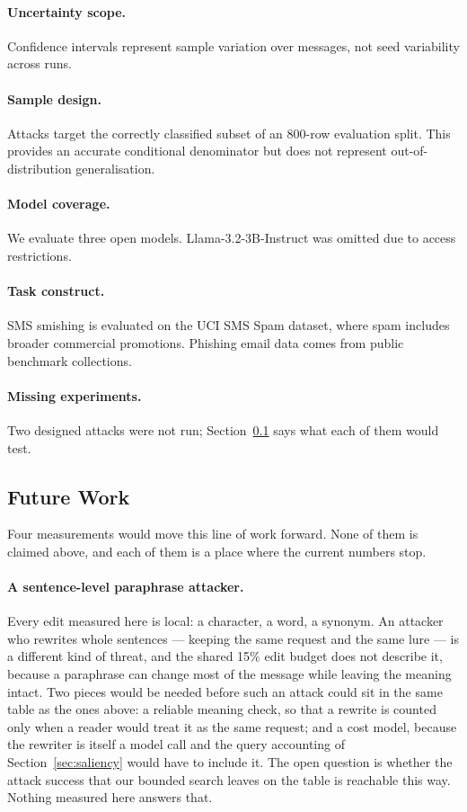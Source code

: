 \paragraph{Uncertainty scope.} Confidence intervals represent sample variation
over messages, not seed variability across runs.

\paragraph{Sample design.} Attacks target the correctly classified subset of an
800-row evaluation split. This provides an accurate conditional denominator but
does not represent out-of-distribution generalisation.

\paragraph{Model coverage.} We evaluate three open models. Llama-3.2-3B-Instruct
was omitted due to access restrictions.

\paragraph{Task construct.} SMS smishing is evaluated on the UCI SMS Spam
dataset, where spam includes broader commercial promotions. Phishing email data
comes from public benchmark collections.

\paragraph{Missing experiments.} Two designed attacks were not run;
Section~\ref{sec:futurework} says what each of them would test.

\subsection{Future Work}
\label{sec:futurework}

Four measurements would move this line of work forward. None of them is claimed
above, and each of them is a place where the current numbers stop.

\paragraph{A sentence-level paraphrase attacker.} Every edit measured here is
local: a character, a word, a synonym. An attacker who rewrites whole sentences
--- keeping the same request and the same lure --- is a different kind of threat,
and the shared 15\% edit budget does not describe it, because a paraphrase can
change most of the message while leaving the meaning intact. Two pieces would be
needed before such an attack could sit in the same table as the ones above: a
reliable meaning check, so that a rewrite is counted only when a reader would
treat it as the same request; and a cost model, because the rewriter is itself a
model call and the query accounting of Section~\ref{sec:saliency} would have to include
it. The open question is whether the attack success that our bounded search
leaves on the table is reachable this way. Nothing measured here answers that.

